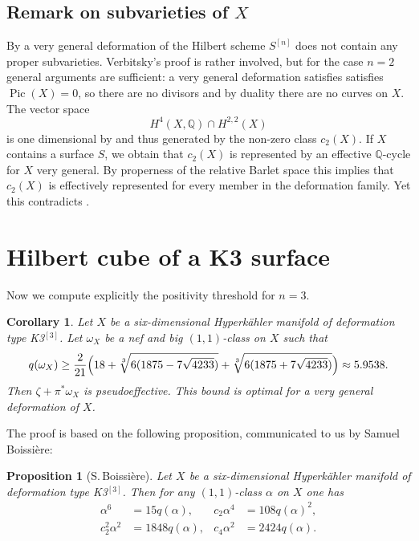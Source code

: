 \documentclass[11pt]{article}
\theoremstyle{plain}
\newtheorem{corollary}[theorem]{Corollary}
\newtheorem{proposition}[theorem]{Proposition}
\theoremstyle{definition}
\newcommand{\Q}{\ensuremath{\mathbb{Q}}}
\DeclareMathOperator{\pic}{Pic}
\begin{document}
\subsection{Remark on subvarieties of $X$}

By \cite[Th.\,1.1]{Ver98} a very general deformation of the Hilbert scheme $S^{[n]}$
does not contain any proper subvarieties. Verbitsky's proof is rather involved,
but for the case $n=2$ general arguments are sufficient:
a very general deformation satisfies satisfies $\pic(X)=0$, so there are no
divisors and by duality there are no curves on $X$.
The vector space
\[
H^4(X,\Q) \cap H^{2,2}(X)
\]
is one dimensional by \cite[Table\,B.1]{Zha15} and thus generated by the non-zero class $c_2(X)$.
If $X$ contains a surface $S$, we obtain that $c_2(X)$ is represented by an effective $\Q$-cycle for $X$ very general.
By properness of the relative Barlet space \cite[Th.\,4.3]{Fujiki78} this implies that $c_2(X)$ is effectively
represented for every member in the deformation family. Yet this contradicts \cite[Prop.\,2]{Ott15}.

\section{Hilbert cube of a K3 surface}

Now we compute explicitly the positivity threshold for $n=3$.

\begin{corollary} \label{corollaryK3cube}
Let $X$ be a six-dimensional Hyperkähler manifold of deformation type K3$^{[3]}$.
Let $\omega_X$ be a nef and big $(1,1)$-class on $X$ such that
\[
q(\omega_X)\geq \frac{2}{21}\Bigl(18+\sqrt[3]{6(1875-7\sqrt{4233})}+\sqrt[3]{6(1875+7\sqrt{4233})}\Bigr) \approx 5.9538.
\]
Then $\zeta+\pi^*\omega_X$ is pseudoeffective.
This bound is optimal for a very general deformation of $X$.
\end{corollary}

The proof is based on the following proposition, communicated to us by Samuel Boissière:

\begin{proposition}[S.\,Boissière] \label{propositionK3cube}
Let $X$ be a six-dimensional Hyperkähler manifold of deformation type K3$^{[3]}$. Then for any $(1,1)$-class
$\alpha$ on $X$ one has
\begin{align*}
\alpha^6&=15q(\alpha), & c_2 \alpha^4&=108q(\alpha)^2,
\\
c_2^2 \alpha^2&=1848 q(\alpha), & c_4 \alpha^2&=2424 q(\alpha).
\end{align*}
\end{proposition}
\end{document}
